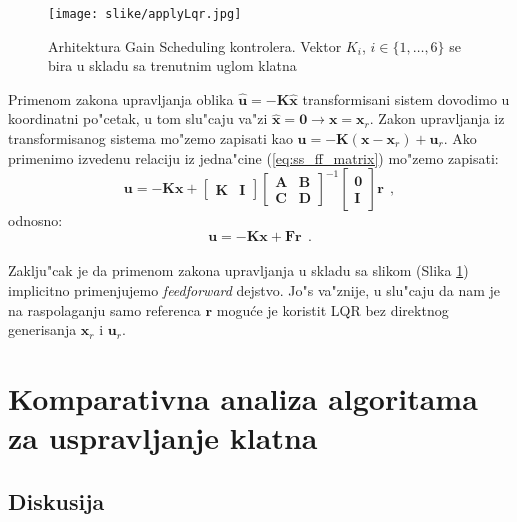 \documentclass[a4paper,11pt]{article}
\theoremstyle{definition} \newtheorem{deff}{Definicija}[section]
\theoremstyle{definition} \newtheorem{prim}[deff]{Primer}
\theoremstyle{plain} \newtheorem{teor}[deff]{Teorema}
\newcommand{\vect}[1]{\boldsymbol{\mathbf{#1}}}
\begin{document}
	\begin{figure}[!h]
		\centering
		\texttt{[image: slike/applyLqr.jpg]}
		\caption{Arhitektura Gain Scheduling kontrolera. Vektor $K_i$, $i \in \{1, \ldots, 6\}$ se bira u skladu sa trenutnim uglom klatna \cite{inicijalna}}
		\label{fig:archGain}
	\end{figure} 
	Primenom zakona upravljanja oblika $\hat{\vect{u}} = - \vect{K}\hat{\vect{x}}$ transformisani sistem dovodimo u koordinatni po"cetak, u tom slu"caju va"zi $\hat{\vect{x}} = \vect{0} \rightarrow \vect{x} = \vect{x}_r$. Zakon upravljanja iz transformisanog sistema mo"zemo zapisati kao $\vect{u} = -\vect{K}(\vect{x} - \vect{x}_r) + \vect{u}_r$. Ako primenimo izvedenu relaciju iz jedna"cine (\ref{eq:ss_ff_matrix}) mo"zemo zapisati:
	\begin{equation}
		\vect{u} = -\vect{K}\vect{x} + \begin{bmatrix} \vect{K} &  \vect{I} \end{bmatrix}
		\begin{bmatrix} \vect{A} &  \vect{B} \\  \vect{C} &  \vect{D} \end{bmatrix}^{-1}
		\begin{bmatrix} \vect{0} \\  \vect{I} \end{bmatrix} \vect{r}~~,
	\end{equation}
	odnosno:
	\begin{equation}\label{eq:ff_final}
		\vect{u} = -\vect{K}\vect{x} + \vect{F} \vect{r}~~.
	\end{equation}\\
	
	Zaklju"cak je da primenom zakona upravljanja u skladu sa slikom (Slika \ref{fig:archGain}) implicitno primenjujemo \emph{feedforward} dejstvo. Jo"s va"znije, u slu"caju da nam je na raspolaganju samo referenca $\mathbf{r}$ mogu\'ce je koristit LQR bez direktnog generisanja $\vect{x}_r$ i $\vect{u}_r$.
	
	
	
	

	
	
	
	
	
	
	
	\newpage
	
	
	\section{Komparativna analiza algoritama za uspravljanje klatna} \label{sec:comp}
	\subsection{Diskusija}
	
\end{document}
